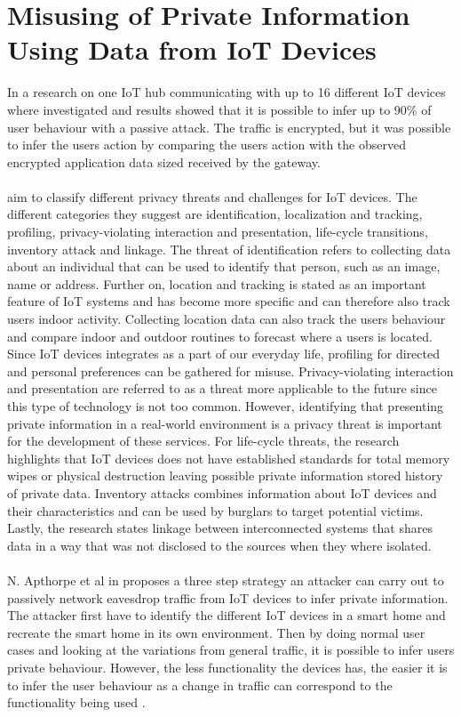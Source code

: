 \section{Misusing of Private Information Using Data from IoT Devices}
In \cite{PassiveInferenceIoT} a research on one IoT hub communicating with up to 16 different IoT devices where investigated and results showed that it is possible to infer up to 90\% of user behaviour with a passive attack. The traffic is encrypted, but it was possible to infer the users action by comparing the users action with the observed encrypted application data sized received by the gateway. 
\\\\
\cite{IoTPrivacyAndMisuse} aim to classify different privacy threats and challenges for IoT devices. The different categories they suggest are identification, localization and tracking, profiling, privacy-violating interaction and presentation, life-cycle transitions, inventory attack and linkage. The threat of identification refers to collecting data about an individual that can be used to identify that person, such as an image, name or address. Further on, location and tracking is stated as an important feature of IoT systems and has become more specific and can therefore also track users indoor activity. Collecting location data can also track the users behaviour and compare indoor and outdoor routines to forecast where a users is located. Since IoT devices integrates as a part of our everyday life, profiling for directed and personal preferences can be gathered for misuse. Privacy-violating interaction and presentation are referred to as a threat more applicable to the future since this type of technology is not too common. However, identifying that presenting private information in a real-world environment is a privacy threat is important for the development of these services. For life-cycle threats, the research \cite{IoTPrivacyAndMisuse} highlights that IoT devices does not have established standards for total memory wipes or physical destruction leaving possible private information stored history of private data. Inventory attacks combines information about IoT devices and their characteristics and can be used by burglars to target potential victims. Lastly, the research states linkage between interconnected systems that shares data in a way that was not disclosed to the sources when they where isolated. 
\\\\
N. Apthorpe et al in \cite{VulEncIoTTraffic} proposes a three step strategy an attacker can carry out to passively network eavesdrop traffic from IoT devices to infer private information. The attacker first have to identify the different IoT devices in a smart home and recreate the smart home in its own environment. Then by doing normal user cases and looking at the variations from general traffic, it is possible to infer users private behaviour. However, the less functionality the devices has, the easier it is to infer the user behaviour as a change in traffic can correspond to the functionality being used \cite{VulEncIoTTraffic}. 
